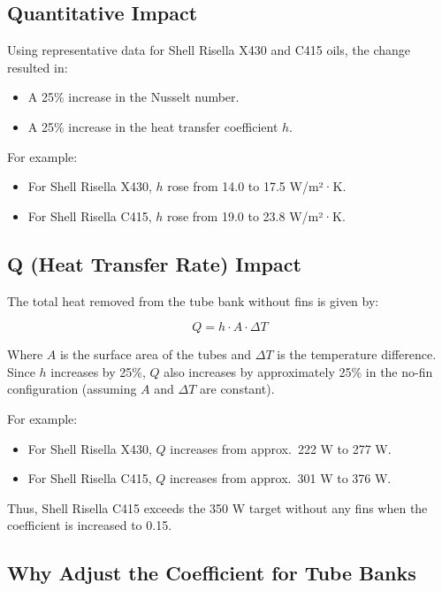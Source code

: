 \documentclass[12pt]{article}
\begin{document}
\subsection*{Quantitative Impact}

Using representative data for Shell Risella X430 and C415 oils, the change resulted in:

\begin{itemize}
    \item A 25\% increase in the Nusselt number.
    \item A 25\% increase in the heat transfer coefficient $h$.
\end{itemize}

For example:

\begin{itemize}
    \item For Shell Risella X430, $h$ rose from 14.0 to 17.5 W/m²·K.
    \item For Shell Risella C415, $h$ rose from 19.0 to 23.8 W/m²·K.
\end{itemize}

\subsection*{Q (Heat Transfer Rate) Impact}

The total heat removed from the tube bank without fins is given by:

\[
Q = h \cdot A \cdot \Delta T
\]

Where $A$ is the surface area of the tubes and $\Delta T$ is the temperature difference. Since $h$ increases by 25\%, $Q$ also increases by approximately 25\% in the no-fin configuration (assuming $A$ and $\Delta T$ are constant).

For example:
\begin{itemize}
    \item For Shell Risella X430, $Q$ increases from approx.\ 222 W to 277 W.
    \item For Shell Risella C415, $Q$ increases from approx.\ 301 W to 376 W.
\end{itemize}

Thus, Shell Risella C415 exceeds the 350 W target without any fins when the coefficient is increased to 0.15.

\subsection*{Why Adjust the Coefficient for Tube Banks}
\end{document}
